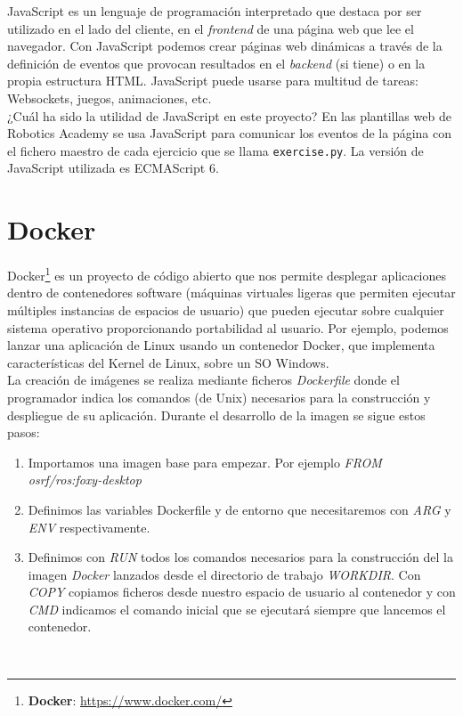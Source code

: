 JavaScript es un lenguaje de programación interpretado que destaca por ser utilizado en el lado del cliente, en el \textit{frontend} de una página web que lee el navegador. Con JavaScript podemos crear páginas web dinámicas a través de la definición de eventos que provocan resultados en el \textit{backend} (si tiene) o en la propia estructura HTML. JavaScript puede usarse para multitud de tareas: Websockets, juegos, animaciones, etc.\\

¿Cuál ha sido la utilidad de JavaScript en este proyecto?
En las plantillas web de Robotics Academy se usa JavaScript para comunicar los eventos de la página con el fichero maestro de cada ejercicio que se llama \texttt{exercise.py}. La versión de JavaScript utilizada es ECMAScript 6.



\section{Docker}
\label{sec:docker}

Docker\footnote{\textbf{Docker}: \url{https://www.docker.com/}} es un proyecto de código abierto que nos permite desplegar aplicaciones dentro de contenedores software (máquinas virtuales ligeras que permiten ejecutar múltiples instancias de espacios de usuario) que pueden ejecutar sobre cualquier sistema operativo proporcionando portabilidad al usuario. Por ejemplo, podemos lanzar una aplicación de Linux usando un contenedor Docker, que implementa características del Kernel de Linux, sobre un SO Windows.\\

La creación de imágenes se realiza mediante ficheros \textit{Dockerfile} donde el programador indica los comandos (de Unix) necesarios para la construcción y despliegue de su aplicación. Durante el desarrollo de la imagen se sigue estos pasos:\\

\begin{enumerate}
	\item Importamos una imagen base para empezar. Por ejemplo \textit{FROM osrf/ros:foxy-desktop}
	\item Definimos las variables Dockerfile y de entorno que necesitaremos con \textit{ARG} y \textit{ENV} respectivamente.
	\item Definimos con \textit{RUN} todos los comandos necesarios para la construcción del la imagen \textit{Docker} lanzados desde el directorio de trabajo \textit{WORKDIR}. Con \textit{COPY} copiamos ficheros desde nuestro espacio de usuario al contenedor y con \textit{CMD} indicamos el comando inicial que se ejecutará siempre que lancemos el contenedor.
\end{enumerate}\

